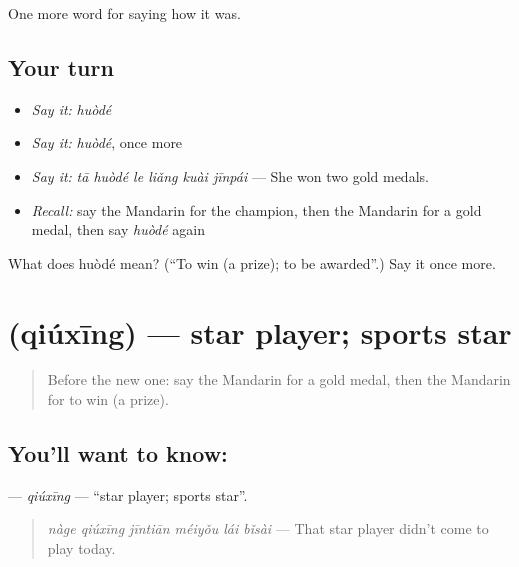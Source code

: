 \begin{grammarlens}[title={What you've built}]
One more word for saying how it was.
\end{grammarlens}

\subsection*{Your turn}
\begin{itemize}
\raggedright
  \item \emph{Say it:} \emph{huòdé}
  \item \emph{Say it:} \emph{huòdé}, once more
  \item \emph{Say it:} \emph{tā huòdé le liǎng kuài jīnpái} — She won two gold medals.
  \item \emph{Recall:} say the Mandarin for the champion, then the Mandarin for a gold medal, then say \emph{huòdé} again
\end{itemize}

\begin{tcolorbox}[breakable,colback=teal!4,colframe=teal!35!black,title={Before you move on}]
What does huòdé mean? (\textquotedblleft{}To win (a prize); to be awarded\textquotedblright{}.) Say it once more.
\end{tcolorbox}
\section[\texorpdfstring{\zh{球星} (qiúxīng)}{球星 (qiúxīng)}]{ (qiúxīng) — star player; sports star}

\label{lesson:ZH-C501-qiuxing}



\begin{quote}
Before the new one: say the Mandarin for a gold medal, then the Mandarin for to win (a prize).
\end{quote}

\subsection*{You'll want to know: }
\textbf{} — \emph{qiúxīng} — \textquotedblleft{}star player; sports star\textquotedblright{}.

\begin{quote}
\textbf{} \emph{nàge qiúxīng jīntiān méiyǒu lái bǐsài} — That star player didn't come to play today.
\end{quote}

